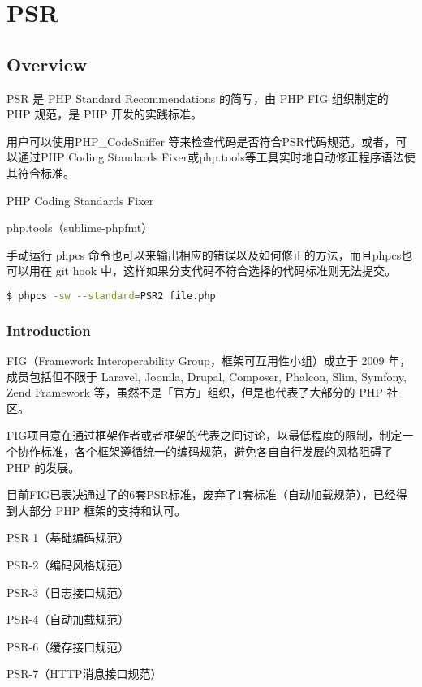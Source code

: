 \part{PSR}


\chapter{Overview}




PSR 是 PHP Standard Recommendations 的简写，由 PHP FIG 组织制定的 PHP 规范，是 PHP 开发的实践标准。

用户可以使用PHP\_CodeSniffer 等来检查代码是否符合PSR代码规范。或者，可以通过PHP Coding Standards Fixer或php.tools等工具实时地自动修正程序语法使其符合标准。 

\begin{compactitem}
\item PHP Coding Standards Fixer
\item php.tools（sublime-phpfmt）
\end{compactitem}


手动运行 phpcs 命令也可以来输出相应的错误以及如何修正的方法，而且phpcs也可以用在 git hook 中，这样如果分支代码不符合选择的代码标准则无法提交。

\begin{lstlisting}[language=bash]
$ phpcs -sw --standard=PSR2 file.php
\end{lstlisting}





\section{Introduction}

FIG（Framework Interoperability Group，框架可互用性小组）成立于 2009 年，成员包括但不限于 Laravel, Joomla, Drupal, Composer, Phalcon, Slim, Symfony, Zend Framework 等，虽然不是「官方」组织，但是也代表了大部分的 PHP 社区。



FIG项目意在通过框架作者或者框架的代表之间讨论，以最低程度的限制，制定一个协作标准，各个框架遵循统一的编码规范，避免各自自行发展的风格阻碍了 PHP 的发展。

目前FIG已表决通过了的6套PSR标准，废弃了1套标准（自动加载规范），已经得到大部分 PHP 框架的支持和认可。

\begin{compactitem}
\item PSR-1（基础编码规范）
\item PSR-2（编码风格规范）
\item PSR-3（日志接口规范）
\item PSR-4（自动加载规范）
\item PSR-6（缓存接口规范）
\item PSR-7（HTTP消息接口规范）
\end{compactitem}

